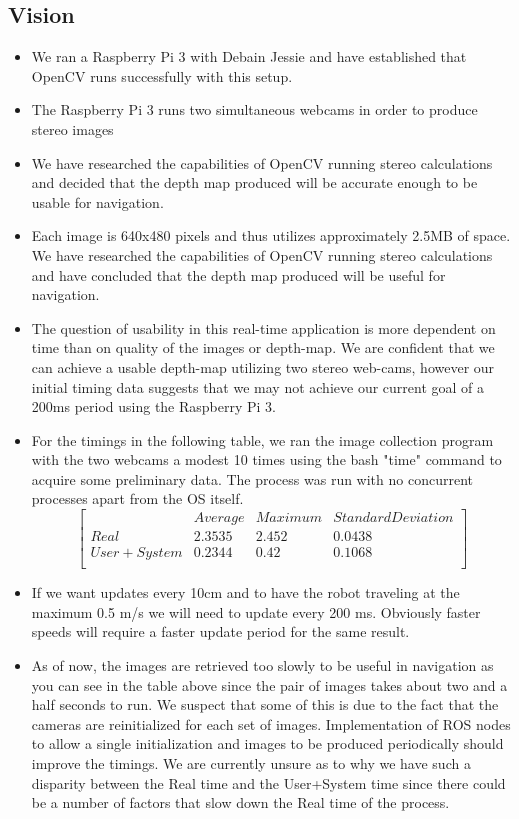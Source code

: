 \documentclass[11pt]{amsart}
\begin{document}
\subsection{Vision}  
\begin{itemize}
\item We ran a Raspberry Pi 3 with Debain Jessie and have established that OpenCV runs successfully with this setup.
\item The Raspberry Pi 3 runs two simultaneous webcams in order to produce stereo images
\item We have researched the capabilities of OpenCV running stereo calculations and decided that the depth map produced will be accurate enough to be usable for navigation.
\item Each image is 640x480 pixels and thus utilizes approximately 2.5MB of space.  We have researched the capabilities of OpenCV running stereo calculations and have concluded that the depth map produced will be useful for navigation.
\item The question of usability in this real-time application is more dependent on time than on quality of the images or depth-map.  We are confident that we can achieve a usable depth-map utilizing two stereo web-cams, however our initial timing data suggests that we may not achieve our current goal of a 200ms period using the Raspberry Pi 3.  
\item For the timings in the following table, we ran the image collection program with the two webcams a modest 10 times using the bash "time" command to acquire some preliminary data.  The process was run with no concurrent processes apart from the OS itself.
\[
\begin{bmatrix}
& Average & Maximum & Standard Deviation \\
Real & 2.3535 & 2.452 & 0.0438 \\
User + System & 0.2344 & 0.42 & 0.1068 \\
\end{bmatrix} 
\]
\item If we want updates every 10cm and to have the robot traveling at the maximum 0.5 m/s we will need to update every 200 ms. Obviously faster speeds will require a faster update period for the same result.
\item As of now, the images are retrieved too slowly to be useful in navigation as you can see in the table above since the pair of images takes about two and a half seconds to run.  We suspect that some of this is due to the fact that the cameras are reinitialized for each set of images.  Implementation of ROS nodes to allow a single initialization and images to be produced periodically should improve the timings. We are currently unsure as to why we have such a disparity between the Real time and the User+System time since there could be a number of factors that slow down the Real time of the process.

\end{itemize}
\end{document}
